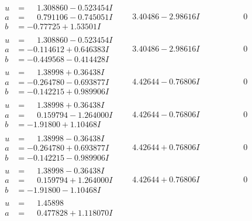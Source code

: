 \documentclass[1p]{elsarticle_modified}
\theoremstyle{definition}
\begin{document}
$$\begin{array}{c|c|c}
 \hline 
\begin{aligned}
u &= \phantom{-}1.308860 - 0.523454 I \\
a &= \phantom{-}0.791106 - 0.745051 I \\
b &= -0.77725 + 1.53501 I\end{aligned}
 & \phantom{-}3.40486 - 2.98616 I & \phantom{-0.000000 } 0 \\ \hline\begin{aligned}
u &= \phantom{-}1.308860 - 0.523454 I \\
a &= -0.114612 + 0.646383 I \\
b &= -0.449568 - 0.414428 I\end{aligned}
 & \phantom{-}3.40486 - 2.98616 I & \phantom{-0.000000 } 0 \\ \hline\begin{aligned}
u &= \phantom{-}1.38998 + 0.36438 I \\
a &= -0.264780 - 0.693877 I \\
b &= -0.142215 + 0.989906 I\end{aligned}
 & \phantom{-}4.42644 - 0.76806 I & \phantom{-0.000000 } 0 \\ \hline\begin{aligned}
u &= \phantom{-}1.38998 + 0.36438 I \\
a &= \phantom{-}0.159794 - 1.264000 I \\
b &= -1.91800 + 1.10468 I\end{aligned}
 & \phantom{-}4.42644 - 0.76806 I & \phantom{-0.000000 } 0 \\ \hline\begin{aligned}
u &= \phantom{-}1.38998 - 0.36438 I \\
a &= -0.264780 + 0.693877 I \\
b &= -0.142215 - 0.989906 I\end{aligned}
 & \phantom{-}4.42644 + 0.76806 I & \phantom{-0.000000 } 0 \\ \hline\begin{aligned}
u &= \phantom{-}1.38998 - 0.36438 I \\
a &= \phantom{-}0.159794 + 1.264000 I \\
b &= -1.91800 - 1.10468 I\end{aligned}
 & \phantom{-}4.42644 + 0.76806 I & \phantom{-0.000000 } 0 \\ \hline\begin{aligned}
u &= \phantom{-}1.45898\phantom{ +0.000000I} \\
a &= \phantom{-}0.477828 + 1.118070 I \\

\end{aligned}
\end{array}$$
\end{document}
